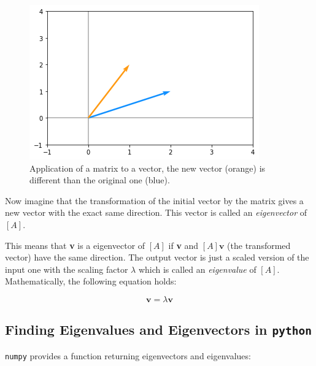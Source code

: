 \begin{figure}[htb]
	\centering
	\includegraphics[width=0.7\linewidth]{figures/matrix_transformation}
	\caption{Application of a matrix to a vector, the new vector (orange) is different than the original one (blue).}
	\label{fig:matrix_as_transform}
\end{figure}



Now imagine that the transformation of the initial vector by the matrix gives a new vector with the exact same direction. This vector is called an \emph{eigenvector} of \([A]\).

This means that \textbf{v} is a eigenvector of \([A]\) if \textbf{v} and \([A]\mathbf{v}\) (the transformed vector) have the same direction. The output vector is just a scaled version of the input one with the scaling factor \(\lambda\) which is called an \emph{eigenvalue} of \([A]\). Mathematically, the following equation holds:

\begin{equation}
[A]\mathbf{v}=\lambda \mathbf{v}
\end{equation}

\subsection{Finding Eigenvalues and Eigenvectors in \texttt{python}}
\label{find-eigenvalues-and-eigenvectors-in-python}

\texttt{numpy} provides a function returning eigenvectors and eigenvalues: 

